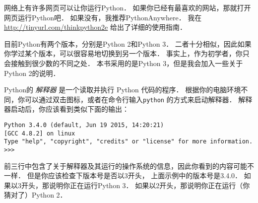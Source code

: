 网络上有许多网页可以让你运行Python． 如果你已经有最喜欢的网站，那就打开网页运行Python吧． 如果没有，我推荐PythonAnywhere． 我在 \href{http://tinyurl.com/thinkpython2e}{http://tinyurl.com/thinkpython2e} 给出了详细的使用指南．
\label{python_anywhere}


目前Python有两个版本，分别是Python 2和Python 3． 二者十分相似，因此如果你学过某个版本，可以很容易地切换到另一个版本． 事实上，作为初学者，你只会接触到很少数的不同之处．
本书采用的是Python 3，但是我会加入一些关于Python 2的说明．


Python的 {\em 解释器} 是一个读取并执行 Python 代码的程序．   根据你的电脑环境不同，你可以通过双击图标，或者在命令行输入\lstinline{python} 的方式来启动解释器． 解释器启动后，你应该看到类似下面的输出：

\begin{lstlisting}
Python 3.4.0 (default, Jun 19 2015, 14:20:21)
[GCC 4.8.2] on linux
Type "help", "copyright", "credits" or "license" for more information.
>>>
\end{lstlisting}

%

前三行中包含了关于解释器及其运行的操作系统的信息，因此你看到的内容可能不一样．  但是你应该检查下版本号是否以3开头， 上面示例中的版本号是3.4.0． 如果以3开头，那说明你正在运行Python 3． 如果以2开头，那说明你正在运行（你猜对了）Python 2．


